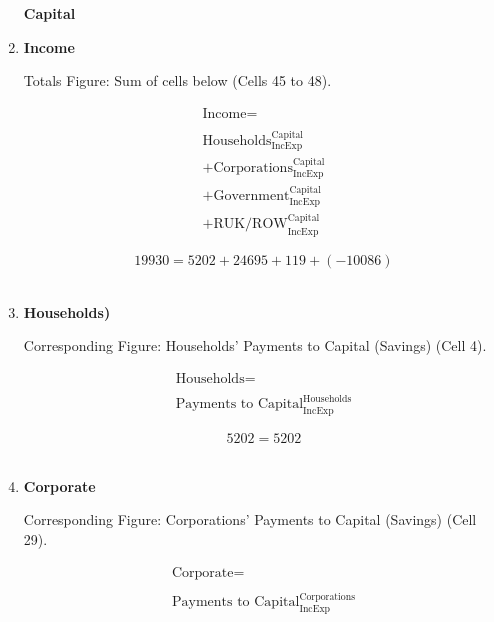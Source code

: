 \begin{enumerate}
\pagebreak


\begin{center}
\textbf{\LARGE Capital}
\end{center}

\item \textbf {Income}

Totals Figure: Sum of cells below (Cells 45 to 48).

\begin{equation}
\begin{split}
\text{Income} =  \\ \\
\text{Households}^\text{Capital}_\text{IncExp}\\
+\text{Corporations}^\text{Capital}_\text{IncExp}\\
+\text{Government}^\text{Capital}_\text{IncExp}\\
+\text{RUK/ROW}^\text{Capital}_\text{IncExp}
\end{split} \label{eq:2.5.48}
\end{equation}

\begin{equation} \nonumber
19930 = 5202+24695+119+(-10086)
\end{equation}\\


\item \textbf {Households)}

Corresponding Figure: Households' Payments to Capital (Savings) (Cell 4).

\begin{equation}
\begin{split}
\text{Households} =  \\ \\
\text{Payments to Capital}^\text{Households}_\text{IncExp}
\end{split} \label{eq:2.5.49}
\end{equation}

\begin{equation} \nonumber
5202 = 5202
\end{equation}\\


\item \textbf {Corporate}

Corresponding Figure: Corporations' Payments to Capital (Savings) (Cell 29).

\begin{equation}
\begin{split}
\text{Corporate} =  \\ \\
\text{Payments to Capital}^\text{Corporations}_\text{IncExp}
\end{split} \label{eq:2.5.50}
\end{equation}


\end{enumerate}
